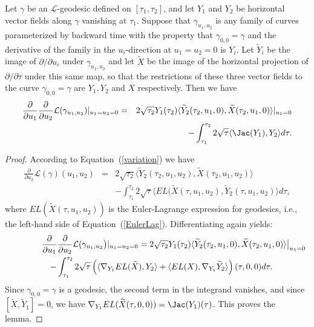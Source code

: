 \begin{lemma}\label{lem:l-length-second-variation-formula}
\label{2ndvari}
Let $\gamma$ be an ${\mathcal L}$-geodesic defined on $
[\tau_1,\tau_2]$, and let $Y_1$ and $Y_2$ be horizontal vector
fields along $\gamma$ vanishing at $\tau_1$. Suppose that
$\gamma_{u_1,u_2}$ is any family of curves parameterized by backward
time with the property that $\gamma_{0,0}=\gamma$ and the derivative
of the family in the $u_i$-direction at $u_1=u_2=0$ is $Y_i$. Let
$\widetilde Y_i$ be the image of $\partial/\partial u_i$ under
$\gamma_{u_1,u_2}$ and let $\widetilde X$ be the image of the
horizontal projection of $\partial/\partial \tau$ under this same
map, so that the restrictions of these three vector fields to the
curve $\gamma_{0,0}=\gamma$ are $Y_1,Y_2$ and $X$ respectively. Then
we have \begin{eqnarray*} \frac{\partial}{\partial
u_1}\frac{\partial}{\partial u_2}{\mathcal
L}(\gamma_{u_1,u_2})|_{u_1=u_2=0} & = & 2\sqrt{\tau_2}
Y_1(\tau_2)\langle \widetilde Y_2(\tau_2,u_1,0),\widetilde
X(\tau_2,u_1,0)\rangle|_{u_1=0}\\
& & -\int_{\tau_1}^{\tau_2}2\sqrt{\tau}\langle \Jac(Y_1),Y_2\rangle d\tau.\end{eqnarray*}
\end{lemma}


\begin{proof}
\sketch
{}
According to Equation~(\ref{variation}) we have
\begin{eqnarray*}
\frac{\partial}{\partial u_2}{\mathcal L}(\gamma)(u_1,u_2)
 & = & 2\sqrt{\tau_2}\langle \widetilde Y_2(\tau_2,u_1,u_2),\widetilde
X(\tau_2,u_1,u_2)\rangle
\\ & & -\int_{\tau_1}^{\tau_2}2\sqrt{\tau}\langle EL(\widetilde
X(\tau,u_1,u_2),\widetilde Y_2(\tau,u_1,u_2)\rangle d\tau,\end{eqnarray*} where
$EL(\widetilde X(\tau,u_1,u_2))$ is the Euler-Lagrange expression for
geodesics, i.e., the left-hand side of Equation~(\ref{EulerLag}).
Differentiating again yields:
\begin{eqnarray}
\lefteqn{\frac{\partial }{\partial u_1}\frac{\partial }{\partial u_2}{\mathcal
L}(\gamma_{u_1,u_2}\bigl)|_{u_1=u_2=0}\big.
 =  2\sqrt{\tau_2}Y_1(\tau_2)\langle \widetilde
Y_2(\tau_2,u_1,0),\widetilde X(\tau_2,u_1,0)\rangle\bigl|_{u_1=0}\bigr.  } \nonumber\\
& & -
\int_{\tau_1}^{\tau_2}2\sqrt{\tau}\left(\langle\nabla_{Y_1}EL(\widetilde
X), Y_2\rangle +\langle EL(X),\nabla_{Y_1}\widetilde
Y_2\rangle\right)(\tau,0,0)d\tau. \label{crosspart} \end{eqnarray}
Since $\gamma_{0,0}=\gamma$ is a geodesic, the second term in the
integrand vanishes, and since $[\widetilde X,\widetilde Y_1]=0$, we
have $\nabla_{Y_1}EL(\widetilde X(\tau,0,0))=\Jac(Y_1)(\tau)$.
This proves the lemma.
\end{proof}

